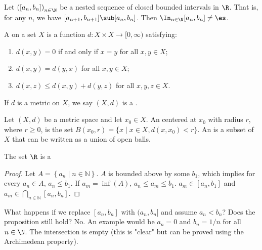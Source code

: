 \documentclass[10pt]{article}
\begin{document}

\begin{definition}
    
\end{definition}
\begin{proposition}
    Let ${([{a}_{n},{b}_{n}])}_{n\in\N}$ be a nested sequence of closed bounded intervals in $\R$. That is, for any $n$, we have $[{a}_{n+1},{b}_{n+1}]\sub[{a}_{n},{b}_{n}]$. Then ${\In}_{n\in\N}[{a}_{n},{b}_{n}]\ne\es$.
\end{proposition}
\begin{definition}
    A  on a set $X$ is a function $d:X\times X\to[0,\infty)$ satisfying:
    \begin{enumerate}
        \item $d(x,y)=0$ if and only if $x=y$ for all $x,y\in X$;
        \item $d(x,y)=d(y,x)$ for all $x,y\in X$;
        \item $d(x,z)\le d(x,y)+d(y,z)$ for all $x,y,z\in X$.
    \end{enumerate}
    If $d$ is a metric on $X$, we say $(X,d)$ is a .
\end{definition}
\begin{definition}
    Let $(X,d)$ be a metric space and let ${x}_{0}\in X$. An  centered at ${x}_{0}$ with radius $r$, where $r\ge 0$, is the set $B({x}_{0},r)=\{x\mid x\in X,d(x,{x}_{0})<r\}$. An  is a subset of $X$ that can be written as a union of open balls.
\end{definition}
\par
The set $\R$ is a 
\begin{proof}
    Let $A=\left \{ a_n\mid n\in \mathbb{N} \right \}$. $A$ is bounded above by some $b_1$, which implies for every $a_n\in A$, $a_n\leq b_1$. If ${a}_{m}=\inf(A)$, $a_n\leq a_m\leq b_1$. $a_m\in [a_n,b_1]$ and $a_m\in \bigcap_{n\in \mathbb{N}}^{} [a_n,b_n]$.
\end{proof}
\par
What happens if we replace $[a_n,b_n]$ with $(a_n,b_n]$ and assume $a_n<b_n$? Does the proposition still hold? No. An example would be $a_n=0$ and $b_n={1}/{n}$ for all $n\in\N$. The intersection is empty (this is "clear" but can be proved using the Archimedean property).



\newpage
\end{document}
